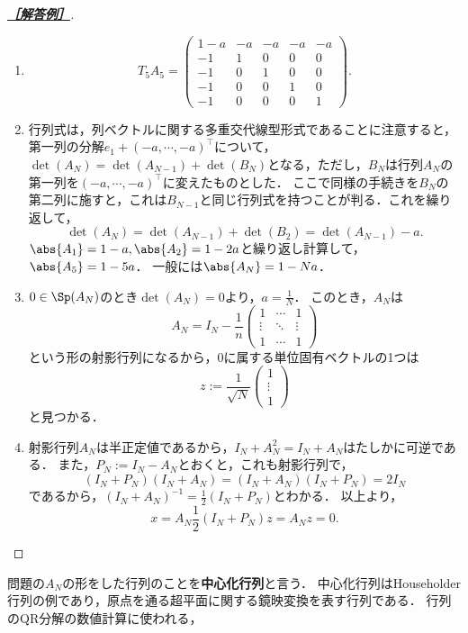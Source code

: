 \documentclass[uplatex,dvipdfmx]{jsarticle}
\begin{document}
\begin{proof}[\textbf{\underline{［解答例］}}]\mbox{}
    \begin{enumerate}
        \item \[T_5A_5=\begin{pmatrix}
            1-a&-a&-a&-a&-a\\
            -1&1&0&0&0\\
            -1&0&1&0&0\\
            -1&0&0&1&0\\
            -1&0&0&0&1
        \end{pmatrix}.\]
        \item 行列式は，列ベクトルに関する多重交代線型形式であることに注意すると，第一列の分解$e_1+(-a,\cdots,-a)^\top$について，$\det(A_N)=\det(A_{N-1})+\det(B_N)$となる，ただし，$B_N$は行列$A_{N}$の第一列を$(-a,\cdots,-a)^{\top}$に変えたものとした．
        ここで同様の手続きを$B_N$の第二列に施すと，これは$B_{N-1}$と同じ行列式を持つことが判る．これを繰り返して，
        \[\det(A_N)=\det(A_{N-1})+\det(B_2)=\det(A_{N-1})-a.\]
        $\abs{A_1}=1-a,\abs{A_2}=1-2a$と繰り返し計算して，$\abs{A_5}=1-5a$．
        一般には$\abs{A_N}=1-Na$．
        \item $0\in\Sp(A_N)$のとき$\det(A_N)=0$より，$a=\frac{1}{N}$．
        このとき，$A_N$は
        \[A_N=I_N-\frac{1}{n}\begin{pmatrix}
            1&\cdots&1\\
            \vdots&\ddots&\vdots\\
            1&\cdots&1
        \end{pmatrix}\]
        という形の射影行列になるから，$0$に属する単位固有ベクトルの1つは
        \[z:=\frac{1}{\sqrt{N}}\begin{pmatrix}
            1\\\vdots\\1
        \end{pmatrix}\]
        と見つかる．
        \item 射影行列$A_N$は半正定値であるから，$I_N+A_N^2=I_N+A_N$はたしかに可逆である．
        また，$P_N:=I_N-A_N$とおくと，これも射影行列で，
        \[(I_N+P_N)(I_N+A_N)=(I_N+A_N)(I_N+P_N)=2I_N\]
        であるから，$(I_N+A_N)^{-1}=\frac{1}{2}(I_N+P_N)$とわかる．
        以上より，
        \[x=A_N\frac{1}{2}(I_N+P_N)z=A_Nz=0.\]
    \end{enumerate}
\end{proof}
\begin{remarks*}
    問題の$A_N$の形をした行列のことを\textbf{中心化行列}と言う．
    中心化行列はHouseholder行列の例であり，原点を通る超平面に関する鏡映変換を表す行列である．
    行列のQR分解の数値計算に使われる，
\end{remarks*}
\end{document}
